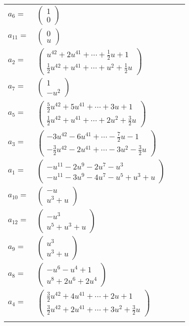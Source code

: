 \documentclass[1p]{elsarticle_modified}
\theoremstyle{definition}
\begin{document}
\begin{tabular}{m{7pt} m{180pt} m{7pt} m{180pt} }
\flushright $a_{6}=$&$\begin{pmatrix}1\\0\end{pmatrix}$ \\
\flushright $a_{11}=$&$\begin{pmatrix}0\\u\end{pmatrix}$ \\
\flushright $a_{2}=$&$\begin{pmatrix}u^{42}+2 u^{41}+\cdots+\frac{1}{2} u+1\\\frac{1}{2} u^{42}+u^{41}+\cdots+u^2+\frac{1}{2} u\end{pmatrix}$ \\
\flushright $a_{7}=$&$\begin{pmatrix}1\\- u^2\end{pmatrix}$ \\
\flushright $a_{5}=$&$\begin{pmatrix}\frac{5}{2} u^{42}+5 u^{41}+\cdots+3 u+1\\\frac{1}{2} u^{42}+u^{41}+\cdots+2 u^2+\frac{3}{2} u\end{pmatrix}$ \\
\flushright $a_{3}=$&$\begin{pmatrix}-3 u^{42}-6 u^{41}+\cdots-\frac{7}{2} u-1\\-\frac{3}{2} u^{42}-2 u^{41}+\cdots-3 u^2-\frac{3}{2} u\end{pmatrix}$ \\
\flushright $a_{1}=$&$\begin{pmatrix}- u^{11}-2 u^9-2 u^7- u^3\\- u^{11}-3 u^9-4 u^7- u^5+u^3+u\end{pmatrix}$ \\
\flushright $a_{10}=$&$\begin{pmatrix}- u\\u^3+u\end{pmatrix}$ \\
\flushright $a_{12}=$&$\begin{pmatrix}- u^3\\u^5+u^3+u\end{pmatrix}$ \\
\flushright $a_{9}=$&$\begin{pmatrix}u^3\\u^3+u\end{pmatrix}$ \\
\flushright $a_{8}=$&$\begin{pmatrix}- u^6- u^4+1\\u^8+2 u^6+2 u^4\end{pmatrix}$ \\
\flushright $a_{4}=$&$\begin{pmatrix}\frac{3}{2} u^{42}+4 u^{41}+\cdots+2 u+1\\\frac{3}{2} u^{42}+2 u^{41}+\cdots+3 u^2+\frac{3}{2} u\end{pmatrix}$\\&\end{tabular}
\end{document}
